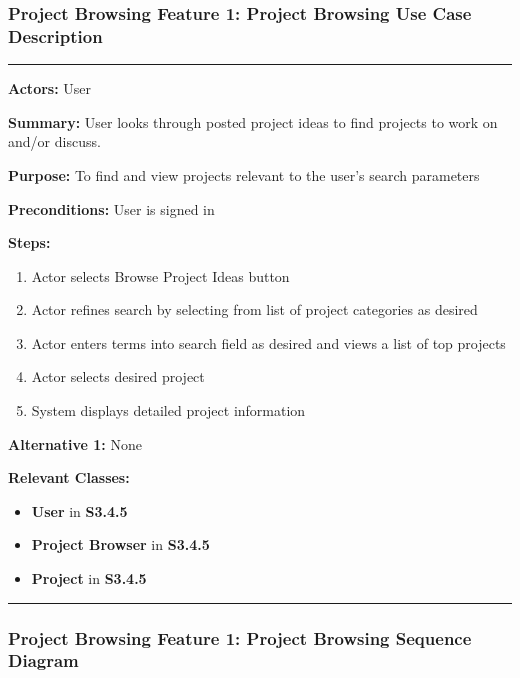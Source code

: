 \documentclass[twoside,letterpaper]{article}
\begin{document}
\newpage

\subsubsection[Project Browsing Feature 1: Project Browsing Use Case Description]{\rmfamily\bfseries\color{black}
Project Browsing Feature 1: Project Browsing Use Case Description}
\hypertarget{RefHeading22059017292}{}

\vspace{2pt}
\hrule
\vspace{8pt}
\textbf{Actors:} User \newline

\noindent\textbf{Summary:} User looks through posted project ideas to find projects to work on and/or discuss. \newline

\noindent\textbf{Purpose:} To find and view projects relevant to the user's search parameters \newline

\noindent\textbf{Preconditions:} User is signed in \newline

\noindent\textbf{Steps:} \begin{enumerate}
	\item Actor selects Browse Project Ideas button
	\item Actor refines search by selecting from list of project categories as desired
	\item Actor enters terms into search field as desired and views a list of top projects
	\item Actor selects desired project
	\item System displays detailed project information
\end{enumerate}
\noindent\textbf{Alternative 1:} None \newline


\noindent\textbf{Relevant Classes:}
\begin{itemize}
	\item \textbf{User} in \textbf{S3.4.5}
	\item \textbf{Project Browser} in \textbf{S3.4.5}
	\item \textbf{Project} in \textbf{S3.4.5}
\end{itemize}
\vspace{8pt}
\hrule
\newpage
\subsubsection[Project Browsing Feature 1: Project Browsing Sequence Diagram]{\rmfamily\bfseries\color{black}
	Project Browsing Feature 1: Project Browsing Sequence Diagram}
\hypertarget{RefHeading22059017292}{}
\end{document}
